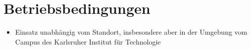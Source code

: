 \section{Betriebsbedingungen}

\begin{itemize}
	\item Einsatz unabhängig vom Standort, insbesondere aber in der Umgebung vom Campus des Karlsruher Institut für Technologie
\end{itemize}